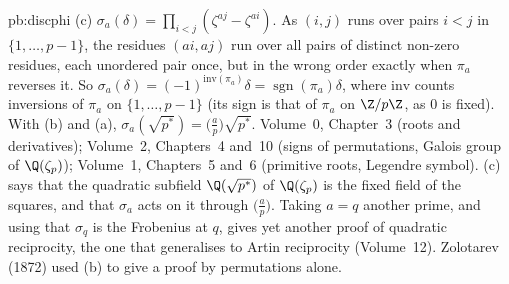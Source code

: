 \begin{solution}{pb:discphi}
(c) $\sigma_a(\delta)=\prod_{i<j}(\zeta^{aj}-\zeta^{ai})$. As $(i,j)$ runs over pairs $i<j$ in $\{1,\dots,p-1\}$, the residues
$(ai,aj)$ run over all pairs of distinct non-zero residues, each unordered pair once, but in the wrong order exactly when
$\pi_a$ reverses it. So $\sigma_a(\delta)=(-1)^{\mathrm{inv}(\pi_a)}\delta=\operatorname{sgn}(\pi_a)\delta$, where $\mathrm{inv}$
counts inversions of $\pi_a$ on $\{1,\dots,p-1\}$ (its sign is that of $\pi_a$ on $\Z/p\Z$, as $0$ is fixed). With (b) and
(a), $\sigma_a(\sqrt{p^*})=\bigl(\frac ap\bigr)\sqrt{p^*}$.
\tools Volume~0, Chapter~3 (roots and derivatives); Volume~2, Chapters~4 and~10 (signs of permutations, Galois group of
$\Q(\zeta_p)$); Volume~1, Chapters~5 and~6 (primitive roots, Legendre symbol).
\leads (c) says that the quadratic subfield $\Q(\sqrt{p^*})$ of $\Q(\zeta_p)$ is the fixed field of the squares, and that
$\sigma_a$ acts on it through $\bigl(\frac ap\bigr)$. Taking $a=q$ another prime, and using that $\sigma_q$ is the Frobenius
at $q$, gives yet another proof of quadratic reciprocity, the one that generalises to Artin reciprocity (Volume~12). Zolotarev
(1872) used (b) to give a proof by permutations alone.
\end{solution}

